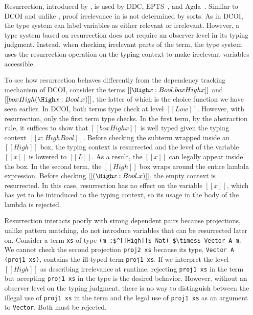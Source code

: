 \documentclass[acmsmall]{acmart}
\newcommand{\name}{DCOI\xspace}
\begin{document}

Resurrection, introduced by \citet{pfenning:irrelevance}, is used by DDC,
EPTS~\citep{mishra2008erasure}, and Agda~\citep{Abel12}. Similar to
\name{} and unlike \citet{gilbert2019definitional}, proof irrelevance
in \citet{pfenning:irrelevance}
is not determined by sorts.
As in \name{}, the type system
can label variables as either relevant or irrelevant. However, a type system
based on resurrection does not require an observer level in its typing
judgment. Instead, when checking irrelevant parts of the term, the type system
uses the resurrection operation on the typing context to make irrelevant
variables accessible.

To see how resurrection behaves differently from the
dependency tracking mechanism of \name{}, consider the terms
$ [[ \High x : Bool . box High x]]$ and $[[ box High (\High x : Bool
. x)]]$, the latter of which is the choice function we have seen earlier.
In \name{}, both terms type check at level $[[Low]]$. However, with
resurrection, only the first term type checks. 
In the first term,
by the
abstraction rule, it suffices to show that $[[box High x]]$ is well typed given the typing context $[[x : High
Bool]]$. Before checking the subterm wrapped inside an $[[High]]$ box,
the typing context is resurrected and the level of the variable $[[x]]$ is lowered
to $[[L]]$. As a result, the $[[x]]$ can legally appear inside the
box.
%
In the second term, the $[[High]]$ box wraps around
the entire lambda expression. Before checking $[[(\High x : Bool
. x)]]$, the empty context is resurrected. In this case, resurrection
has no effect on the variable $[[x]]$, which has yet to be introduced
to the typing context, so
its usage in the
body of the lambda is rejected.

Resurrection interacts poorly with strong dependent pairs because
projections, unlike pattern matching, do not introduce
variables that can be resurrected later on.
Consider a term \lstinline{xs} of type
\lstinline{(m :$^[[High]]$ Nat) $\times$ Vector A m}. %
We cannot check the second projection \lstinline{proj2 xs}
because its type, \lstinline{Vector A (proj1 xs)}, contains the
ill-typed term \lstinline{proj1 xs}. If we interpret the level
$[[High]]$ as describing irrelevance at runtime, 
rejecting \lstinline{proj1 xs} in the term but accepting
\lstinline{proj1 xs} in the type is the desired behavior. 
However, without an observer level on the typing judgment,
there is no way to distinguish
between the illegal use of \lstinline{proj1 xs} in the term and
the legal use of \lstinline{proj1 xs} as an argument to
\lstinline{Vector}. Both must be
rejected.
\end{document}
